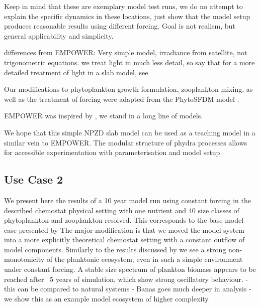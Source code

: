 \documentclass[journal abbreviations, manuscript]{copernicus}
\begin{document}
Keep in mind that these are exemplary model test runs, we do no attempt to explain the specific dynamics in these locations, just show that the model setup produces reasonable results using different forcing. Goal is not realism, but general applicability and simplicity. 





differences from EMPOWER: 
Very simple model,
irradiance from satellite, not trigonometric equations. we treat light in much less detail, so say that for a more detailed treatment of light in a slab model, see \cite{Anderson2015c}

Our modifications to phytoplankton growth formulation, zooplankton mixing, as well as the treatment of forcing were adapted from the PhytoSFDM model \cite{Acevedo-Trejos2016}.

EMPOWER was inspired by \cite{Fasham1990a}, we stand in a long line of models. 

We hope that this simple NPZD slab model can be used as a teaching model in a similar vein to EMPOWER. The modular structure of phydra processes allows for accessible experimentation with parameterisation and model setup. 



\subsection{Use Case 2}


We present here the results of a 10 year model run using constant forcing in the described chemostat physical setting with one nutrient and 40 size classes of phytoplankton and zooplankton resolved. This corresponds to the base model case presented by \cite{Banas2011b} The major modification is that we moved the model system into a more explicitly theoretical chemostat setting with a constant outflow of model components. Similarly to the results discussed by \cite{Banas2011b} we see a strong non-monotonicity of the planktonic ecosystem, even in such a simple environment under constant forcing. A stable size spectrum of plankton biomass appears to be reached after ~5 years of simulation, which show strong oscillatory behaviour. 
- this can be compared to natural systems
- Banas goes much deeper in analysis
- we show this as an example model ecosystem of higher complexity
\end{document}
